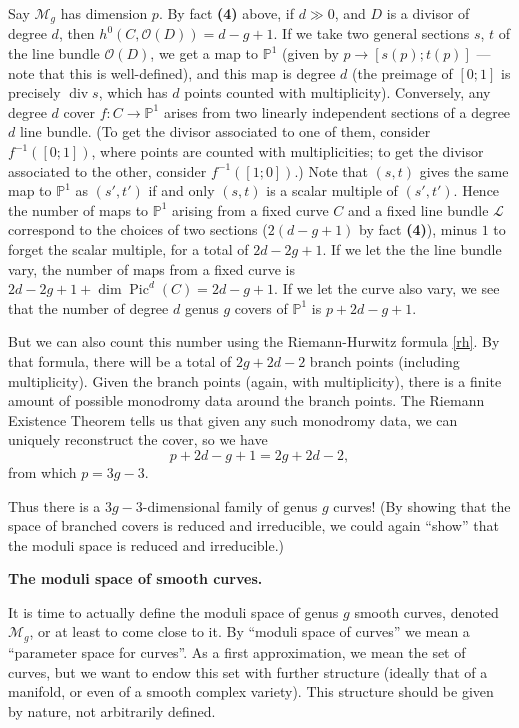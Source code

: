 \documentclass[12pt,letterpaper]{amsart}
\newcommand{\bpoint}[1]{\vspace{3mm}\par \noindent \refstepcounter{subsection}{\bf \thesubsection.} 
  {\bf #1.} }
\newcommand{\proj}{\mathbb P}
\newcommand{\oh}{{\mathcal{O}}}
\renewcommand{\cL}{{\mathcal{L}}}
\newcommand{\cm}{{\mathcal{M}}}
\newcommand{\Pic}{\operatorname{Pic}}
\begin{document}
{
Say $\cm_g$ has dimension $p$.  By fact {\bf (4)} above, if 
$d \gg 0$, and $D$ is a
divisor of degree $d$, then $h^0(C, \oh(D)) = d-g+1$.  
If we take two general sections $s$, $t$ of the line bundle $\oh(D)$,
we get a map to $\proj^1$ (given by $p \rightarrow [s(p);t(p)]$
--- note that this is well-defined), and this map is degree
$d$ (the preimage of $[0;1]$ is precisely $\operatorname{div} s$,
which has $d$ points counted with multiplicity).
Conversely, any degree $d$ cover  $f: C \rightarrow \proj^1$ arises
from two linearly independent sections of a degree $d$
line bundle.  (To get the divisor associated to one of them,
consider $f^{-1}([0;1])$, where points are counted with multiplicities;
to get the divisor associated to the other, consider $f^{-1}([1;0])$.)
Note that $(s,t)$ gives the same map to $\proj^1$ as $(s', t')$
if and only $(s,t)$ is a scalar multiple of $(s', t')$.
Hence the number of maps to $\proj^1$ arising from a fixed
curve $C$ and a fixed line bundle $\cL$ correspond
to the choices of two sections ($2(d-g+1)$ by fact {\bf (4)}),
minus $1$ to forget the scalar multiple, for a total
of $2d-2g+1$.  If we let the the line bundle vary, the
number of maps from a fixed curve is $2d-2g+1+\dim \Pic^d(C) =
2d-g+1$.  If we let the curve also vary, we see that the number
of degree $d$ genus $g$ covers of $\proj^1$ is 
$\boxed{p+2d-g+1}$.

But we can also count this number using the Riemann-Hurwitz formula
\eqref{rh}.  By that formula, there will be a total of $2g+2d-2$ branch points
(including multiplicity). 
Given the branch points (again, with multiplicity), there is a finite amount
of possible monodromy data around the branch points.
The Riemann Existence Theorem tells us that given any such monodromy
data, we can uniquely reconstruct the cover, so we have
$$
p+2d-g+1 = 2g+2d-2,$$
from which
$\boxed{p=3g-3}$.

Thus there is a $3g-3$-dimensional family of genus $g$ curves!  (By
showing that the space of branched covers is reduced and irreducible,
we could again ``show'' that the moduli space is reduced and irreducible.)

\bpoint{The moduli space of smooth curves}

It is time to actually define the moduli space of genus $g$ smooth curves,
denoted $\cm_g$, or at least to come close to it.  By ``moduli space
of curves'' we mean a ``parameter space for curves''.  As a first
approximation, we mean the set of curves, but we want to endow this
set with further structure (ideally that of a manifold, or even of a
smooth complex variety).  This structure should be given by nature,
not arbitrarily defined.

}
\end{document}
